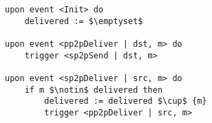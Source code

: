 \begin{lstlisting}[caption=Perfect links, mathescape, captionpos=b]
upon event <Init> do
    delivered := $\emptyset$

upon event <pp2pDeliver | dst, m> do
    trigger <sp2pSend | dst, m>

upon event <sp2pDeliver | src, m> do
    if m $\notin$ delivered then
        delivered := delivered $\cup$ {m}
        trigger <pp2pDeliver | src, m>
\end{lstlisting}
